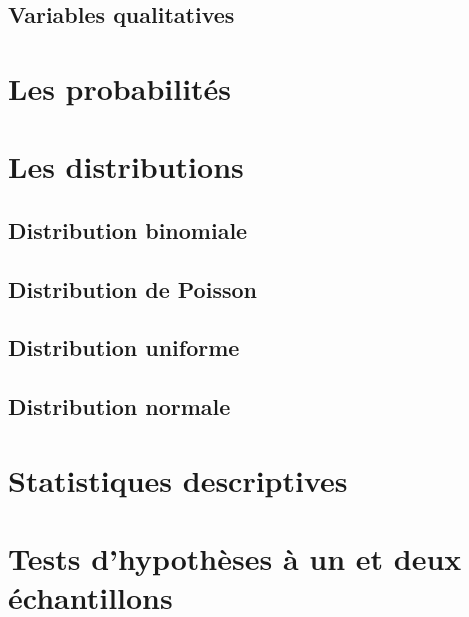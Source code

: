 \documentclass[]{book}
\begin{document}
\hypertarget{variables-qualitatives}{%
\subsection{Variables qualitatives}\label{variables-qualitatives}}

\hypertarget{les-probabilituxe9s}{%
\section{Les probabilités}\label{les-probabilituxe9s}}

\hypertarget{les-distributions}{%
\section{Les distributions}\label{les-distributions}}

\hypertarget{distribution-binomiale}{%
\subsection{Distribution binomiale}\label{distribution-binomiale}}

\hypertarget{distribution-de-poisson}{%
\subsection{Distribution de Poisson}\label{distribution-de-poisson}}

\hypertarget{distribution-uniforme}{%
\subsection{Distribution uniforme}\label{distribution-uniforme}}

\hypertarget{distribution-normale}{%
\subsection{Distribution normale}\label{distribution-normale}}

\hypertarget{statistiques-descriptives}{%
\section{Statistiques descriptives}\label{statistiques-descriptives}}

\hypertarget{tests-dhypothuxe8ses-uxe0-un-et-deux-uxe9chantillons}{%
\section{Tests d'hypothèses à un et deux
échantillons}\label{tests-dhypothuxe8ses-uxe0-un-et-deux-uxe9chantillons}}
\end{document}
